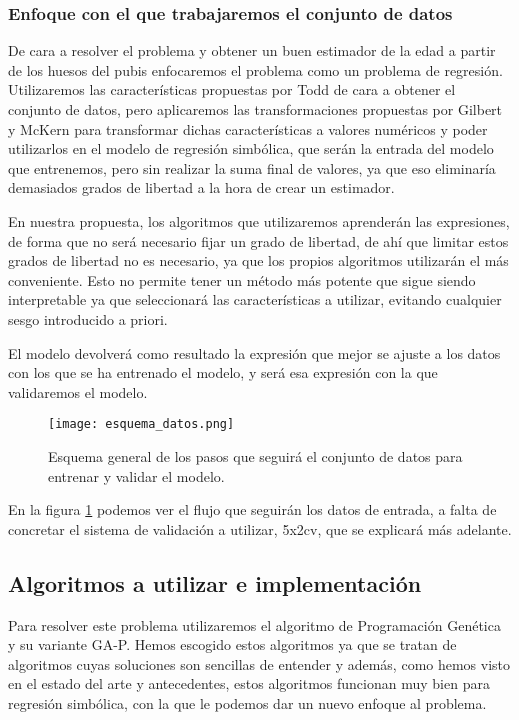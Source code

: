 \subsubsection{Enfoque con el que trabajaremos el conjunto de datos}

De cara a resolver el problema y obtener un buen estimador de la edad a partir de los huesos del pubis enfocaremos el problema como un problema de regresión. Utilizaremos las características propuestas por Todd de cara a obtener el conjunto de datos, pero aplicaremos las transformaciones propuestas por Gilbert y McKern para transformar dichas características a valores numéricos y poder utilizarlos en el modelo de regresión simbólica, que serán la entrada del modelo que entrenemos, pero sin realizar la suma final de valores, ya que eso eliminaría demasiados grados de libertad a la hora de crear un estimador.

En nuestra propuesta, los algoritmos que utilizaremos aprenderán las expresiones, de forma que no será necesario fijar un grado de libertad, de ahí que limitar estos grados de libertad no es necesario, ya que los propios algoritmos utilizarán el más conveniente. Esto no permite tener un método más potente que sigue siendo interpretable ya que seleccionará las características a utilizar, evitando cualquier sesgo introducido a priori.

El modelo devolverá como resultado la expresión que mejor se ajuste a los datos con los que se ha entrenado el modelo, y será esa expresión con la que validaremos el modelo.

\begin{figure}[H]
    \centering
	  \texttt{[image: esquema\_datos.png]}
    \caption{Esquema general de los pasos que seguirá el conjunto de datos para entrenar y validar el modelo.}
	 \label{fig:esquema_datos}
\end{figure}

En la figura \ref{fig:esquema_datos} podemos ver el flujo que seguirán los datos de entrada, a falta de concretar el sistema de validación a utilizar, 5x2cv, que se explicará más adelante.

\newpage

\subsection{Algoritmos a utilizar e implementación}

Para resolver este problema utilizaremos el algoritmo de Programación Genética y su variante GA-P. Hemos escogido estos algoritmos ya que se tratan de algoritmos cuyas soluciones son sencillas de entender y además, como hemos visto en el estado del arte y antecedentes, estos algoritmos funcionan muy bien para regresión simbólica, con la que le podemos dar un nuevo enfoque al problema.

